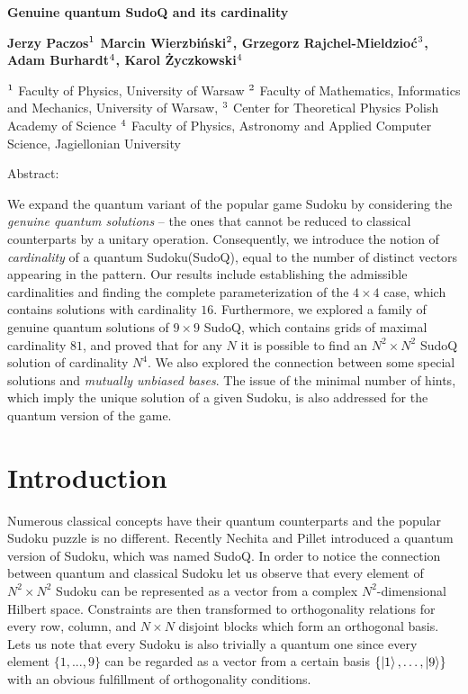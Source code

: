 \documentclass[11pt]{article}
\begin{document}
\begin{center}
{ \bf \Large 
Genuine quantum SudoQ and its cardinality
} \bigskip

{ \bf \large
	\bf{Jerzy Paczos}$^{\rm 1}$
	\bf{Marcin Wierzbiński}$^{\rm 2}$,
	\bf{Grzegorz Rajchel-Mieldzioć}$^{\rm 3}$,
	\bf{Adam Burhardt}$^{\rm 4}$,
	\bf{Karol Życzkowski}$^{\rm 4}$
} \bigskip

\begin{center}
$^{\rm 1}$ Faculty of Physics, University of Warsaw
$^{\rm 2}$ Faculty of Mathematics, Informatics and Mechanics, University of Warsaw,
$^{\rm 3}$ Center for Theoretical Physics Polish Academy of Science $^{\rm 4}$ Faculty of Physics, Astronomy and Applied Computer Science, Jagiellonian University
\end{center}
\end{center}

\bigskip

\begin{center}
    Abstract:
\end{center} 
We expand the quantum variant of the popular game Sudoku by considering the \emph{genuine quantum solutions} – the ones that cannot be reduced to classical counterparts by a unitary operation. Consequently, we introduce the notion of \emph{cardinality} of a quantum Sudoku(SudoQ), equal to the number of distinct vectors appearing in the pattern.  Our results include establishing the admissible cardinalities and finding the complete parameterization of the $4\times 4$ case, which contains solutions with cardinality $16$. Furthermore, we explored a family of genuine quantum solutions of $9\times 9$ SudoQ, which contains grids of maximal cardinality $81$, and proved that for any $N$  it is possible to find an $N^2\times N^2$ SudoQ solution of cardinality $N^4$. We also explored the connection between some special solutions and \emph{mutually unbiased bases}. The issue of the minimal number of hints, which imply the unique solution of a given Sudoku, is also addressed for the quantum version of the game.

\section{Introduction}
Numerous classical concepts have their quantum counterparts and the popular Sudoku puzzle is no different. Recently Nechita and Pillet \cite{Nechita2020SudoQA} introduced a quantum version of Sudoku, which was named SudoQ. In order to notice the connection between quantum and classical Sudoku let us observe that every element of $N^{2}\times N^{2}$ Sudoku can be represented as a vector from a complex $N^{2}$-dimensional Hilbert space. Constraints are then transformed to orthogonality relations for every row, column, and $N \times N$ disjoint blocks which form an orthogonal basis. Lets us note that every Sudoku is also trivially a quantum one since every element $\{1, ..., 9\}$ can be regarded as a vector from a certain basis $\{ \ket{1}, \ldots , \ket{9}\}$ with an obvious fulfillment of orthogonality conditions.
\end{document}
